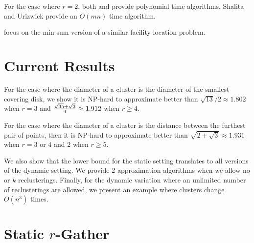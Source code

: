 \documentclass[11pt]{article}
\begin{document}
For the case where $r = 2$, both \cite{DBLP:conf/stoc/AnshelevichK07} and \cite{Shalita:2009:EAP:1496770.1496781} provide polynomial time algorithms.  Shalita and Urizwick \cite{Shalita:2009:EAP:1496770.1496781} provide an $O(mn)$ time algorithm.

\cite{Guha:2000:HPN:892551, Karget:2000:BST:795666.796578,Svitkina:2008:LFL:1347082.1347208} focus on the min-sum version of a similar facility location problem.

\section{Current Results}

For the case where the diameter of a cluster is the diameter of the smallest covering disk, we show it is NP-hard to approximate better than $\sqrt{13}/2 \approx 1.802$ when $r=3$ and ${\sqrt{35}+\sqrt{3} \over 4} \approx 1.912$ when $r \geq 4$.

For the case where the diameter of a cluster is the distance between the furthest pair of points, then it is NP-hard to approximate better than $\sqrt{2+\sqrt{3}} \approx 1.931$ when $r=3$ or $4$ and $2$ when $r\geq5$.

We also show that the lower bound for the static setting translates to all versions of the dynamic setting.  
We provide 2-approximation algorithms when we allow no or $k$ reclusterings.  Finally, for the dynamic variation where an unlimited number of reclusterings are allowed, we present an example where clusters change $O(n^3)$ times.


\section{Static $r$-Gather}
\end{document}
